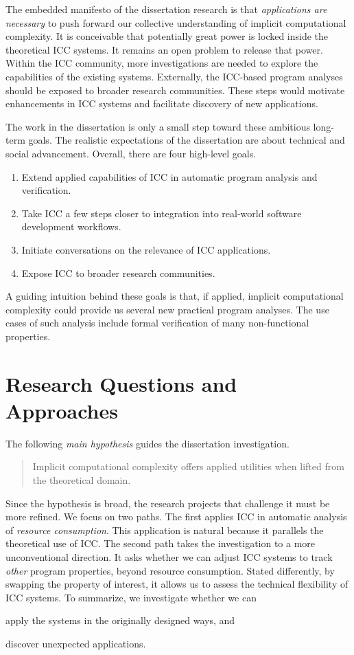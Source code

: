 The embedded manifesto of the dissertation research is that \emph{applications
are necessary} to push forward our collective understanding of implicit
computational complexity. It is conceivable that potentially great power is
locked inside the theoretical ICC systems. It remains an open problem to release
that power. Within the ICC community, more investigations are needed to explore
the capabilities of the existing systems. Externally, the ICC-based program
analyses should be exposed to broader research communities. These steps would
motivate enhancements in ICC systems and facilitate discovery of new
applications.

The work in the dissertation is only a small step toward these ambitious
long-term goals. The realistic expectations of the dissertation are about
technical and social advancement. Overall, there are four high-level goals.
\begin{enumerate}
\item Extend {applied} capabilities of ICC in automatic program analysis and
verification.
\item Take ICC a few steps closer to integration into real-world software
development workflows.
\item Initiate conversations on the relevance of ICC applications.
\item Expose ICC to broader research communities.
\end{enumerate}
A guiding intuition behind these goals is that, {if applied}, implicit
computational complexity could provide us several new practical program
analyses. The use cases of such analysis include formal verification of many
non-functional properties.

\section{Research Questions and Approaches}
\label{sec:aicc-approaches}

The following \emph{main hypothesis} guides the dissertation investigation.
\begin{quote}
\noindent Implicit computational complexity offers applied utilities when lifted
from the theoretical domain.
\end{quote}
Since the hypothesis is broad, the research projects that challenge it must be
more refined. We focus on two paths. The first applies ICC in automatic analysis
of \emph{resource consumption}. This application is natural because it parallels
the theoretical use of ICC. The second path takes the investigation to a more
unconventional direction. It asks whether we can adjust ICC systems to track
\emph{other} program properties, beyond resource consumption. Stated
differently, by swapping the property of interest, it allows us to assess the
technical flexibility of ICC systems. To summarize, we investigate whether we
can \begin{enumerate*}[label=(\roman*)]
\item apply the systems in the originally designed ways, and
\item discover unexpected applications.
\end{enumerate*}

